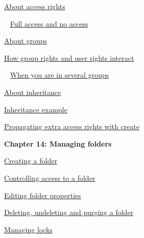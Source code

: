 \documentclass[11pt,a4paper]{article}
\begin{document}
\href{https://www.ibm.com/support/knowledgecenter/search/About%20access%20rights?scope=SSYQBZ_9.6.1}{About access rights}

\,\,\, \href{https://www.ibm.com/support/knowledgecenter/search/Full%20access%20and%20no%20access?scope=SSYQBZ_9.6.1}{Full access and no access}

\href{https://www.ibm.com/support/knowledgecenter/search/About%20groups?scope=SSYQBZ_9.6.1}{About groups}

\href{https://www.ibm.com/support/knowledgecenter/search/How%20group%20rights%20and%20user%20rights%20interact?scope=SSYQBZ_9.6.1}{How group rights and user rights interact}

\,\,\, \href{https://www.ibm.com/support/knowledgecenter/search/When%20you%20are%20in%20several%20groups?scope=SSYQBZ_9.6.1}{When you are in several groups}

\href{https://www.ibm.com/support/knowledgecenter/search/About%20inheritance?scope=SSYQBZ_9.6.1}{About inheritance}

\href{https://www.ibm.com/support/knowledgecenter/search/Inheritance%20example?scope=SSYQBZ_9.6.1}{Inheritance example}

\href{https://www.ibm.com/support/knowledgecenter/search/Propagating%20extra%20access%20rights%20with%20create?scope=SSYQBZ_9.6.1}{Propagating extra access rights with create} \\

\newpage

\begin{Large}\textbf{Chapter 14: Managing folders} \end{Large} 
\vspace{1mm}

\href{https://www.ibm.com/support/knowledgecenter/search/Creating%20a%20folder?scope=SSYQBZ_9.6.1}{Creating a folder}

\href{https://www.ibm.com/support/knowledgecenter/search/Controlling%20access%20to%20a%20folder?scope=SSYQBZ_9.6.1}{Controlling access to a folder}

\href{https://www.ibm.com/support/knowledgecenter/search/Editing%20folder%20properties?scope=SSYQBZ_9.6.1}{Editing folder properties}

\href{https://www.ibm.com/support/knowledgecenter/search/Deleting,%20undeleting%20and%20purging%20a%20folder?scope=SSYQBZ_9.6.1}{Deleting, undeleting and purging a folder}

\href{https://www.ibm.com/support/knowledgecenter/search/Managing%20locks?scope=SSYQBZ_9.6.1}{Managing locks} \\
\end{document}
